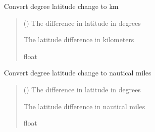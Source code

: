 \documentclass[letterpaper,10pt,english]{sphinxmanual}
\begin{document}

\begin{fulllineitems}
\label{\detokenize{misc:glomar_gridding.utils.deg_to_km}}
\pysigstartsignatures
\pysiglinewithargsret
{}
{}
{}
\pysigstopsignatures
\sphinxAtStartPar
Convert degree latitude change to km
\begin{quote}\begin{description}
\sphinxAtStartPar
{} () \textendash{} The difference in latitude in degrees

\sphinxAtStartPar
The latitude difference in kilometers

\sphinxAtStartPar
float

\end{description}\end{quote}

\end{fulllineitems}


\begin{fulllineitems}
\label{\detokenize{misc:glomar_gridding.utils.deg_to_nm}}
\pysigstartsignatures
\pysiglinewithargsret
{}
{}
{}
\pysigstopsignatures
\sphinxAtStartPar
Convert degree latitude change to nautical miles
\begin{quote}\begin{description}
\sphinxAtStartPar
{} () \textendash{} The difference in latitude in degrees

\sphinxAtStartPar
The latitude difference in nautical miles

\sphinxAtStartPar
float

\end{description}\end{quote}

\end{fulllineitems}
\end{document}
